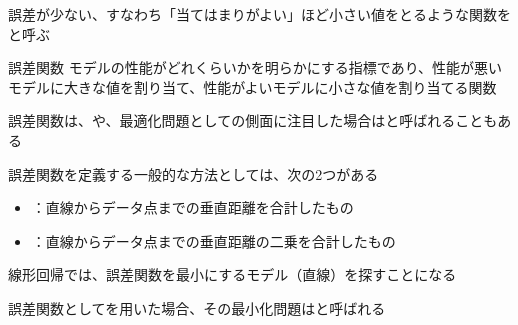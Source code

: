 \documentclass[../../../topic_machine-learning]{subfiles}
\begin{document}
誤差が少ない、すなわち「当てはまりがよい」ほど小さい値をとるような関数をと呼ぶ

\begin{definition}{誤差関数}
  モデルの性能がどれくらいかを明らかにする指標であり、性能が悪いモデルに大きな値を割り当て、性能がよいモデルに小さな値を割り当てる関数
\end{definition}

誤差関数は、や、最適化問題としての側面に注目した場合はと呼ばれることもある

\br

誤差関数を定義する一般的な方法としては、次の2つがある

\begin{itemize}
  \item {}：直線からデータ点までの垂直距離を合計したもの
  \item {}：直線からデータ点までの垂直距離の二乗を合計したもの
\end{itemize}

線形回帰では、誤差関数を最小にするモデル（直線）を探すことになる

誤差関数としてを用いた場合、その最小化問題はと呼ばれる
\end{document}
